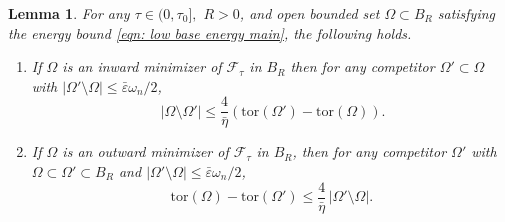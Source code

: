 \documentclass[10pt, reqno]{amsart}
\numberwithin{equation}{section}
\newtheorem{lemma}[theorem]{Lemma}
\def\e{\varepsilon}
\def\W{\Omega}
\def\om{\omega}
\def\tor{\mathrm{tor}}
\def\err{\tau}
\def\Ep{\mathcal{F}_{\err}}
\def\baryEps{\bar{\e}}
\begin{document}
\begin{lemma}\label{lem: basic est outward min} For any $\tau \in (0, \tau_0],$ $R>0$, and open bounded set $\W \subset B_R$ satisfying the energy bound \eqref{eqn: low base energy main}, the following holds.
	\begin{enumerate}
		\item If $\W$ is an inward minimizer of $\Ep$ in $B_R$ then for any  competitor $\W'\subset \W$ with $|\W'\setminus\W| \leq \baryEps\om_n/2$,
		\begin{equation}
	\label{eqn: nondegen est 22}
 \, |\W \setminus \W'| \leq \frac{4}{\bar\eta} \left( \tor(\W') - \tor(\W)\right).
\end{equation}
		\item If $\W$ is an outward minimizer of $\Ep$ in $B_R$, then for any  competitor $\W'$ with $\W \subset \W' \subset B_R$ and   $|\W'\setminus\W| \leq \baryEps \om_n/2$,
	\begin{equation}
		\label{eqn: sym diff bounds tor}
\tor(\W) - \tor(\W') \leq \frac{4}{\bar\eta} \, |\W' \setminus \W|.
	\end{equation}
	\end{enumerate}
\end{lemma} 
\end{document}
